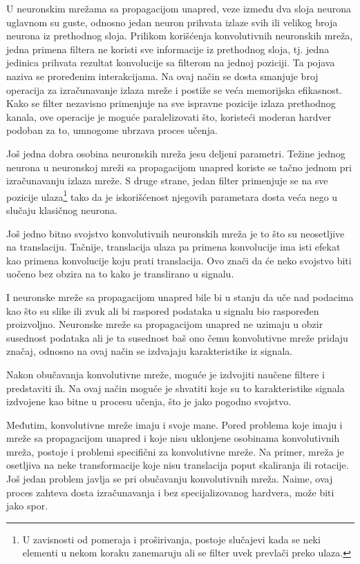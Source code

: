 U neuronskim mrežama sa propagacijom unapred, veze između dva sloja neurona uglavnom su guste, odnosno jedan neuron prihvata izlaze svih ili velikog broja neurona iz prethodnog sloja. Prilikom korišćenja konvolutivnih neuronskih mreža, jedna primena filtera ne koristi sve informacije iz prethodnog sloja, tj. jedna jedinica prihvata rezultat konvolucije sa filterom na jednoj poziciji. Ta pojava naziva se proređenim interakcijama. Na ovaj način se dosta smanjuje broj operacija za izračunavanje izlaza mreže i postiže se veća memorijska efikasnost. Kako se filter nezavisno primenjuje na sve ispravne pozicije izlaza prethodnog kanala, ove operacije je moguće paralelizovati što, koristeći moderan hardver podoban za to, umnogome ubrzava proces učenja.
\par 
Još jedna dobra osobina neuronskih mreža jesu deljeni parametri. Težine jednog neurona u neuronskoj mreži sa propagacijom unapred koriste se tačno jednom pri izračunavanju izlaza mreže. S druge strane, jedan filter primenjuje se na sve pozicije ulaza\footnote{U zavisnosti od pomeraja i proširivanja, postoje slučajevi kada se neki elementi u nekom koraku zanemaruju ali se filter uvek prevlači preko ulaza.} tako da je iskorišćenost njegovih parametara dosta veća nego u slučaju klasičnog neurona.  
\par Još jedno bitno svojstvo konvolutivnih neuronskih mreža je to što su neosetljive na translaciju. Tačnije, translacija ulaza pa primena konvolucije ima isti efekat kao primena konvolucije koju prati translacija. Ovo znači da će neko svojstvo biti uočeno bez obzira na to kako je translirano u signalu.
\par I neuronske mreže sa propagacijom unapred bile bi u stanju da uče nad podacima kao što su slike ili zvuk ali bi raspored podataka u signalu bio raspoređen proizvoljno. Neuronske mreže sa propagacijom unapred ne uzimaju u obzir susednost podataka ali je ta susednost baš ono čemu konvolutivne mreže pridaju značaj, odnosno na ovaj način se izdvajaju karakteristike iz signala. 
\par Nakon obučavanja konvolutivne mreže, moguće je izdvojiti naučene filtere i predstaviti ih. Na ovaj način moguće je shvatiti koje su to karakteristike signala izdvojene kao bitne u procesu učenja, što je jako pogodno svojstvo.
\par Međutim, konvolutivne mreže imaju i svoje mane. Pored problema koje imaju i mreže sa propagacijom unapred i koje nisu uklonjene osobinama konvolutivnih mreža, postoje i problemi specifični za konvolutivne mreže. Na primer, mreža je osetljiva na neke transformacije koje nisu translacija poput skaliranja ili rotacije. Još jedan problem javlja se pri obučavanju konvolutivnih mreža. Naime, ovaj proces zahteva dosta izračunavanja i bez specijalizovanog hardvera, može biti jako spor.






